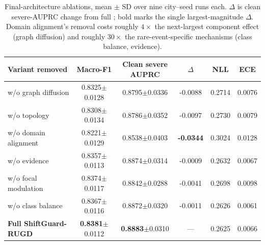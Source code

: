 \begin{table}[t]
\centering
\caption{Final-architecture ablations, mean $\pm$ SD over nine city--seed runs each. $\Delta$ is clean severe-AUPRC change from full \methodname{}; bold marks the single largest-magnitude $\Delta$. Domain alignment's removal costs roughly $4\times$ the next-largest component effect (graph diffusion) and roughly $30\times$ the rare-event-specific mechanisms (class balance, evidence).}
\label{tab:ablation}
\begin{tabular}{lccccc}
\toprule
Variant removed & Macro-F1 & Clean severe AUPRC & $\Delta$ & NLL & ECE \\
\midrule
w/o graph diffusion & 0.8325$\pm$0.0128 & 0.8795$\pm$0.0336 & -0.0088 & 0.2714 & 0.0076 \\
w/o topology & 0.8308$\pm$0.0134 & 0.8786$\pm$0.0352 & -0.0097 & 0.2730 & 0.0079 \\
w/o domain alignment & 0.8221$\pm$0.0129 & 0.8538$\pm$0.0403 & \textbf{-0.0344} & 0.3024 & 0.0128 \\
w/o evidence & 0.8357$\pm$0.0113 & 0.8874$\pm$0.0314 & -0.0009 & 0.2632 & 0.0067 \\
w/o focal modulation & 0.8374$\pm$0.0117 & 0.8842$\pm$0.0288 & -0.0041 & 0.2698 & 0.0098 \\
w/o class balance & 0.8367$\pm$0.0116 & 0.8872$\pm$0.0320 & -0.0011 & 0.2626 & 0.0061 \\
\midrule
\textbf{Full ShiftGuard-RUGD} & \textbf{0.8381}$\pm$0.0112 & \textbf{0.8883}$\pm$0.0310 & --- & 0.2625 & 0.0066 \\
\bottomrule
\end{tabular}
\end{table}
